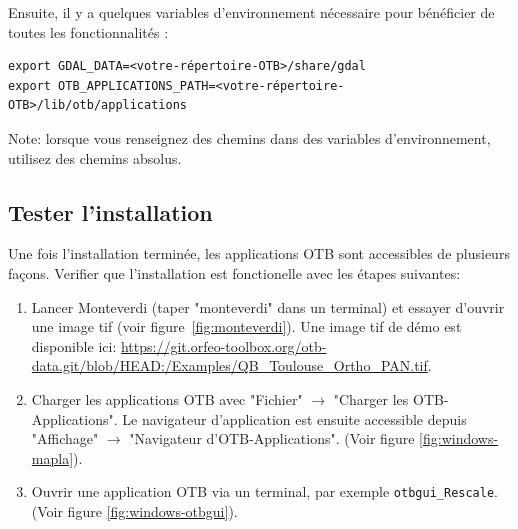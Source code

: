 \documentclass[10pt,a4paper]{article}
\begin{document}
Ensuite, il y a quelques variables d'environnement nécessaire pour bénéficier de 
toutes les fonctionnalités :
\begin{verbatim}
export GDAL_DATA=<votre-répertoire-OTB>/share/gdal
export OTB_APPLICATIONS_PATH=<votre-répertoire-OTB>/lib/otb/applications
\end{verbatim}

Note: lorsque vous renseignez des chemins dans des variables d'environnement,
utilisez des chemins absolus.

\subsection{Tester l'installation}
Une fois l'installation terminée, les applications OTB sont accessibles de
plusieurs façons. Verifier que l'installation est fonctionelle avec les étapes
suivantes:
\begin{enumerate}

\item Lancer Monteverdi (taper "monteverdi" dans un terminal) et essayer
d'ouvrir une image tif (voir figure~\ref{fig:monteverdi}). Une image tif de
démo est disponible ici:
\url{https://git.orfeo-toolbox.org/otb-data.git/blob/HEAD:/Examples/QB\_Toulouse\_Ortho\_PAN.tif}.

\item Charger les applications OTB avec "Fichier" $\rightarrow$ "Charger les
OTB-Applications".
Le navigateur d'application est ensuite accessible depuis "Affichage"
$\rightarrow$ "Navigateur d'OTB-Applications".
(Voir figure \ref{fig:windows-mapla}).

\item Ouvrir une application OTB via un terminal, par exemple
\texttt{otbgui\_Rescale}. (Voir figure \ref{fig:windows-otbgui}).

\end{enumerate}
\end{document}
